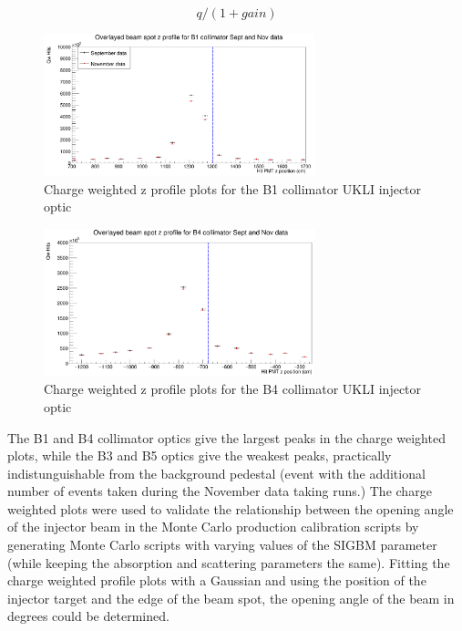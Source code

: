 \begin{equation}
    q/(1 + gain)
\label{eq:gain_correction}
\end{equation}

\begin{figure}
    \centering
    \includegraphics[width=0.7\textwidth]{Figures/charge_weighted_nov_sept_B1.PNG}
    \caption{Charge weighted z profile plots for the B1 collimator UKLI injector optic}
    \label{fig:charge_weighted_nov_sept_B1}
\end{figure}

\begin{figure}
    \centering
    \includegraphics[width=0.7\textwidth]{Figures/charge_weighted_nov_sept_B4.PNG}
    \caption{Charge weighted z profile plots for the B4 collimator UKLI injector optic}
    \label{fig:charge_weighted_nov_sept_B4}
\end{figure}

The B1 and B4 collimator optics give the largest peaks in the charge weighted plots, while the B3 and B5 optics give the weakest peaks, practically indistunguishable from the background pedestal (event with the additional number of events taken during the November data taking runs.) The charge weighted plots were used to validate the relationship between the opening angle of the injector beam in the Monte Carlo production calibration scripts by generating Monte Carlo scripts with varying values of the SIGBM parameter (while keeping the absorption and scattering parameters the same). Fitting the charge weighted profile plots with a Gaussian and using the position of the injector target and the edge of the beam spot, the opening angle of the beam in degrees could be determined.

